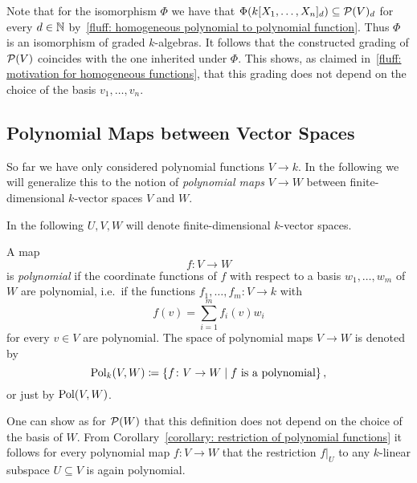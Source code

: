 \begin{fluff}
  Note that for the isomorphism $\Phi$ we have that $\Phi( k[X_1, \dotsc, X_n]_d ) \subseteq \mathcal{P}(V)_d$ for every $d \in \mathbb{N}$ by~\ref{fluff: homogeneous polynomial to polynomial function}.
  Thus $\Phi$ is an isomorphism of graded $k$-algebras.
  It follows that the constructed grading of $\mathcal{P}(V)$ coincides with the one inherited under $\Phi$.
  This shows, as claimed in~\ref{fluff: motivation for homogeneous functions}, that this grading does not depend on the choice of the basis $v_1, \dotsc, v_n$.
\end{fluff}







\subsection{Polynomial Maps between Vector Spaces}

\begin{fluff}
  So far we have only considered polynomial functions $V \to k$.
  In the following we will generalize this to the notion of \emph{polynomial maps} $V \to W$ between finite-dimensional $k$-vector spaces $V$ and $W$.
\end{fluff}


\begin{conventions}
  In the following $U, V, W$ will denote finite-dimensional $k$-vector spaces.
\end{conventions}


\begin{definition}
  A map
  \[
            f
    \colon  V
    \to     W
  \]
  is \emph{polynomial} if the coordinate functions of $f$ with respect to a basis $w_1, \dotsc, w_m$ of $W$ are polynomial, i.e.\ if the functions $f_1, \dotsc, f_m \colon V \to k$ with
  \[
      f(v)
    = \sum_{i=1}^m f_i(v) w_i
  \]
  for every $v \in V$ are polynomial.
  The space of polynomial maps $V \to W$ is denoted by
  \[
              \operatorname{Pol}_k(V,W)
    \coloneqq  \{
                        f
                \colon  V
                \to     W
              \mid
                \text{$f$ is a polynomial}
              \} \,,
  \]
  or just by $\operatorname{Pol}(V,W)$.
\end{definition}


\begin{remark}
  One can show as for $\mathcal{P}(W)$ that this definition does not depend on the choice of the basis of $W$.
  From Corollary~\ref{corollary: restriction of polynomial functions} it follows for every polynomial map $f \colon V \to W$ that the restriction $f|_U$ to any $k$-linear subspace $U \subseteq V$ is again polynomial.
\end{remark}


